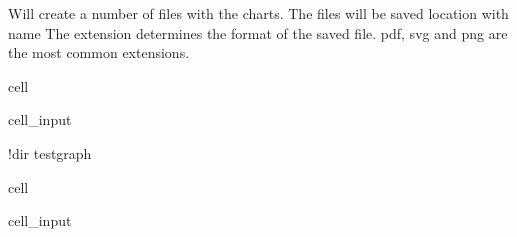 \documentclass[letterpaper,10pt,english]{jupyterBook}
\begin{document}
\sphinxAtStartPar
{}
Will create a number of files with the charts.
The files will be saved location with name  The extension determines the
format of the saved file. pdf, svg and png are the most common extensions.

\begin{sphinxuseclass}{cell}\begin{sphinxVerbatimInput}

\begin{sphinxuseclass}{cell_input}
\begin{sphinxVerbatim}[commandchars=\\\{\}]
!dir testgraph\PYGZbs{}
\end{sphinxVerbatim}

\end{sphinxuseclass}\end{sphinxVerbatimInput}

\end{sphinxuseclass}
\begin{sphinxuseclass}{cell}\begin{sphinxVerbatimInput}

\begin{sphinxuseclass}{cell_input}
\begin{sphinxVerbatim}[commandchars=\\\{\}]
  
\end{sphinxVerbatim}

\end{sphinxuseclass}\end{sphinxVerbatimInput}

\end{sphinxuseclass}
\end{document}
